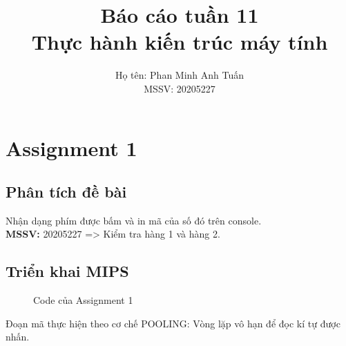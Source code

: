 \documentclass[a4paper,12pt]{article}
\title{\textbf{Báo cáo tuần 11 \\ Thực hành kiến trúc máy tính}}
\author{Họ tên: Phan Minh Anh Tuấn \\ MSSV: 20205227}
\date{}
\begin{document}
	\maketitle
	\tableofcontents
	\newpage
\section{Assignment 1}
	\subsection{Phân tích đề bài}
	Nhận dạng phím được bấm và in mã của số đó trên console. \\
	\textbf{MSSV:} 20205227 => Kiểm tra hàng 1 và hàng 2.
	\subsection{Triển khai MIPS}
	\FloatBarrier
	\begin{figure}[ht!]
		\centerline{}
		\caption{Code của Assignment 1}
		\label{fig:ass1}
	\end{figure}
	\noindent
	Đoạn mã thực hiện theo cơ chế POOLING: Vòng lặp vô hạn để đọc kí tự được nhấn.
	\clearpage
\end{document}
